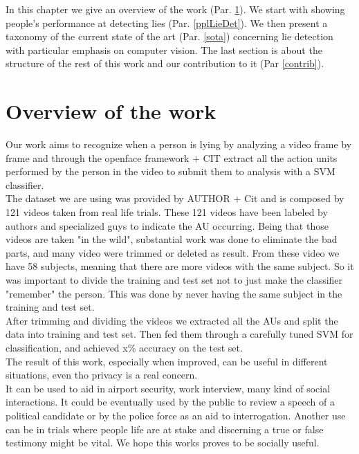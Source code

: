 In this chapter we give an overview of the work (Par. \ref{overview}). We start with showing people's performance at detecting lies (Par. \ref{pplLieDet}). We then present a taxonomy of the current state of the art (Par. \ref{sota}) concerning lie detection with particular emphasis on computer vision. The last section is about the structure of the rest of this work and our contribution to it (Par \ref{contrib}).

\pagebreak

\section{Overview of the work} \label{overview}
Our work aims to recognize when a person is lying by analyzing a video frame by frame and through the openface framework + CIT extract all the action units performed by the person in the video to submit them to analysis with a SVM classifier.\\
The dataset we are using was provided by AUTHOR + Cit and is composed by 121 videos taken from real life trials. These 121 videos have been labeled by authors and specialized guys to indicate the AU occurring. Being that those videos are taken "in the wild", substantial work was done to eliminate the bad parts, and many video were trimmed or deleted as result. From these video we have 58 subjects, meaning that there are more videos with the same subject. So it was important to divide the training and test set not to just make the classifier "remember" the person. This was done by never having the same subject in the training and test set.\\
After trimming and dividing the videos we extracted all the AUs and split the data into training and test set. Then fed them through a carefully tuned SVM for classification, and achieved x\% accuracy on the test set.\\
The result of this work, especially when improved, can be useful in different situations, even tho privacy is a real concern.\\
It can be used to aid in airport security, work interview, many kind of social interactions. It could be eventually used by the public to review a speech of a political candidate or by the police force as an aid to interrogation. Another use can be in trials where people life are at stake and discerning a true or false testimony might be vital. We hope this works proves to be socially useful.



